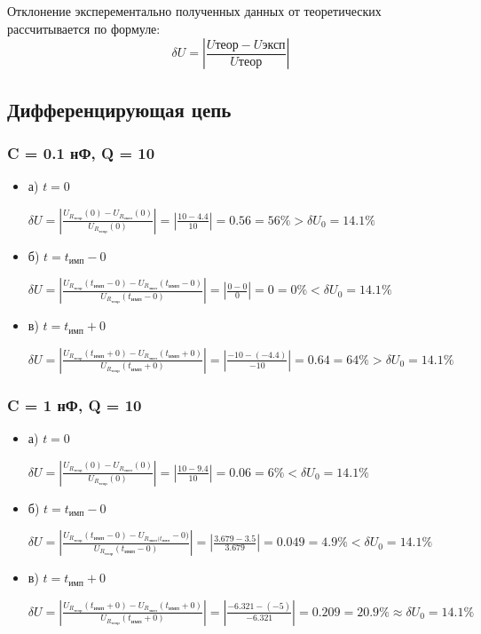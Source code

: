 \documentclass[a4paper,14pt]{extarticle}
\begin{document}
Отклонение эксперементально полученных данных от теоретических рассчитывается по формуле:
\[
\delta U = \left|\frac{U\text{теор}-U\text{эксп}}{U\text{теор}}\right|
\]

\subsection{Дифференцирующая цепь}

\subsubsection{C = 0.1 нФ, Q = 10}

\begin{itemize}
\item[] а) $t = 0$

	$\delta U = \left| \frac{U_{R_\text{теор}}(0) - U_{R_\text{эксп}}(0)}{U_{R_\text{теор}}(0)} \right| = \left| \frac{10 - 4.4}{10} \right| = 0.56 = 56\% > \delta U_0 = 14.1\%$

\item[] б) $t = t_\text{имп}-0$

	$\delta U = \left| \frac{U_{R_\text{теор}}(t_\text{имп}-0) - U_{R_\text{эксп}}(t_\text{имп}-0)}{U_{R_\text{теор}}(t_\text{имп}-0)} \right| = \left| \frac{0 - 0}{0} \right| = 0 = 0\% < \delta U_0 = 14.1\%$

\item[] в)  $t = t_\text{имп}+0$

	$\delta U = \left| \frac{U_{R_\text{теор}}(t_\text{имп}+0) - U_{R_\text{эксп}}(t_\text{имп}+0)}{U_{R_\text{теор}}(t_\text{имп}+0)} \right| = \left| \frac{-10 - (-4.4)}{-10} \right| = 0.64 = 64\% > \delta U_0 = 14.1\%$
\end{itemize}

\subsubsection{C = 1 нФ, Q = 10}

\begin{itemize}
\item[] а)  $t = 0$

	$\delta U = \left| \frac{U_{R_\text{теор}}(0) - U_{R_\text{эксп}}(0)}{U_{R_\text{теор}}(0)} \right| = \left| \frac{10 - 9.4}{10} \right| = 0.06 = 6\% < \delta U_0 = 14.1\%$

\item[] б) $t = t_\text{имп}-0$

	$\delta U = \left| \frac{U_{R_\text{теор}}(t_\text{имп}-0) - U_{R_\text{эксп}(t_\text{имп}}-0)}{U_{R_\text{теор}}(t_\text{имп}-0)} \right| = \left| \frac{3.679 - 3.5}{3.679} \right| = 0.049 = 4.9\% < \delta U_0 = 14.1\%$

\item[] в) $t = t_\text{имп}+0$

	$\delta U = \left| \frac{U_{R_\text{теор}}(t_\text{имп}+0) - U_{R_\text{эксп}}(t_\text{имп}+0)}{U_{R_\text{теор}}(t_\text{имп}+0)} \right| = \left| \frac{-6.321 - (-5)}{-6.321} \right| = 0.209 = 20.9\% \approx \delta U_0 = 14.1\%$
\end{itemize}
\end{document}
